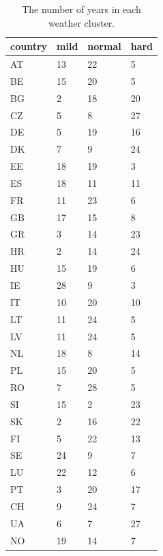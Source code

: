 \documentclass[12pt]{article}
\begin{document}
\begin{table}[h!]
\centering
\begin{tabular}{l|lll}
country   & mild & normal & hard \\ \hline
AT & 13   & 22     & 5    \\
BE & 15   & 20     & 5    \\
BG & 2    & 18     & 20   \\
CZ & 5    & 8      & 27   \\
DE & 5    & 19     & 16   \\
DK & 7    & 9      & 24   \\
EE & 18   & 19     & 3    \\
ES & 18   & 11     & 11   \\
FR & 11   & 23     & 6    \\
GB & 17   & 15     & 8    \\
GR & 3    & 14     & 23   \\
HR & 2    & 14     & 24   \\
HU & 15   & 19     & 6    \\
IE & 28   & 9      & 3    \\
IT & 10   & 20     & 10   \\
LT & 11   & 24     & 5    \\
LV & 11   & 24     & 5    \\
NL & 18   & 8      & 14   \\
PL & 15   & 20     & 5    \\
RO & 7    & 28     & 5    \\
SI & 15   & 2      & 23   \\
SK & 2    & 16     & 22   \\
FI & 5    & 22     & 13   \\
SE & 24   & 9      & 7    \\
LU & 22   & 12     & 6    \\
PT & 3    & 20     & 17   \\
CH & 9    & 24     & 7    \\
UA & 6    & 7      & 27   \\
NO & 19   & 14     & 7   
\end{tabular}
\caption{The number of years in each weather cluster. } \label{table:clusters_size}
\end{table}
\end{document}
